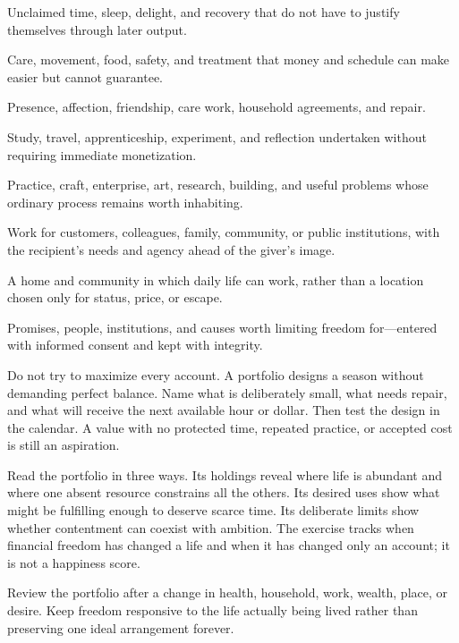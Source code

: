 \begin{description}[leftmargin=2.8em,style=nextline]
\item[Rest and play] Unclaimed time, sleep, delight, and recovery that do
  not have to justify themselves through later output.
\item[Health] Care, movement, food, safety, and treatment that money and
  schedule can make easier but cannot guarantee.
\item[People] Presence, affection, friendship, care work, household
  agreements, and repair.
\item[Learning] Study, travel, apprenticeship, experiment, and reflection
  undertaken without requiring immediate monetization.
\item[Mastery and making] Practice, craft, enterprise, art, research,
  building, and useful problems whose ordinary process remains worth
  inhabiting.
\item[Service] Work for customers, colleagues, family, community, or public
  institutions, with the recipient's needs and agency ahead of the giver's
  image.
\item[Place] A home and community in which daily life can work, rather than a
  location chosen only for status, price, or escape.
\item[Chosen obligations] Promises, people, institutions, and causes worth
  limiting freedom for---entered with informed consent and kept with
  integrity.
\end{description}

Do not try to maximize every account. A portfolio designs a season without
demanding perfect balance. Name what is deliberately small, what needs
repair, and what will receive the next available hour or dollar. Then test the
design in the calendar. A value with no protected time, repeated practice, or
accepted cost is still an aspiration.

Read the portfolio in three ways. Its holdings reveal where life is abundant
and where one absent resource constrains all the others. Its desired uses show
what might be fulfilling enough to deserve scarce time. Its deliberate limits
show whether contentment can coexist with ambition. The exercise tracks when
financial freedom has changed a life and when it has changed only an account;
it is not a happiness score.

Review the portfolio after a change in health, household, work, wealth, place,
or desire. Keep freedom responsive to the life actually being lived rather
than preserving one ideal arrangement forever.

